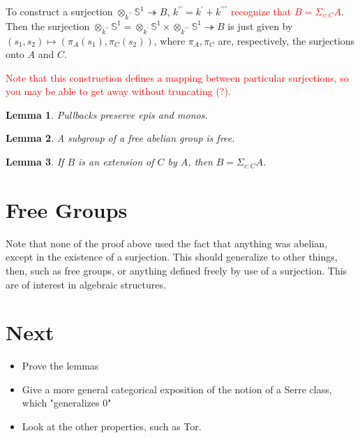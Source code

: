 \documentclass{article}
\newcommand{\0}{\mathbf{0}}
\newcommand{\1}{\mathbf{1}}
\newcommand{\pr}{^\prime}
\newcommand{\surj}{\twoheadrightarrow}
\newcommand{\sone}{\mathbb{S}^1}
\newtheorem{lemma}{Lemma}
\begin{document}
\begin{center}
\end{center}


To construct a surjection $\otimes_{k^{\prime\prime}} \sone \surj B$, $k^{\prime\prime} = k\pr + k^{\prime \prime \prime}$ \textcolor{red}{recognize that $B = \Sigma_{c : C} A$}. Then the surjection $\otimes_{k^{\prime\prime}} \sone = \otimes_{k^{\prime}} \sone \times \otimes_{k^{\prime\prime\prime}} \sone \surj B$ is just given by $(s_1,s_2) \mapsto (\pi_A(s_1), \pi_C(s_2))$, where $\pi_A,\pi_C$ are, respectively, the surjections onto $A$ and $C$.

\textcolor{red}{Note that this construction defines a mapping between particular surjections, so you may be able to get away without truncating (?).}

\begin{lemma}
Pullbacks preserve epis and monos.
\end{lemma}

\begin{lemma}
A subgroup of a free abelian group is free.
\end{lemma}

\begin{lemma}
If $B$ is an extension of $C$ by $A$, then $B = \Sigma_{c : C} A$.
\end{lemma}

\section{Free Groups}
Note that none of the proof above used the fact that anything was abelian, except in the existence of a surjection. This should generalize to other things, then, such as free groups, or anything defined freely by use of a surjection. This are of interest in algebraic structures.

\section{Next}
\begin{itemize}
    \item Prove the lemmas
    \item Give a more general categorical exposition of the notion of a Serre class, which "generalizes 0"
    \item Look at the other properties, such as Tor.
\end{itemize}
\end{document}
